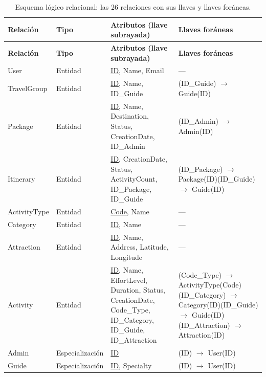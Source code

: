 \documentclass[11pt,a4paper]{article}
\begin{document}
{\footnotesize\setlength{\tabcolsep}{3pt}\renewcommand{\arraystretch}{1.15}
\begin{longtable}{|>{\raggedright\arraybackslash}p{2.88cm}|>{\raggedright\arraybackslash}p{2.35cm}|>{\raggedright\arraybackslash}p{5.00cm}|>{\raggedright\arraybackslash}p{5.07cm}|}
\caption{Esquema lógico relacional: las 26 relaciones con sus llaves y llaves foráneas.}\label{tab:esquema}\\ \hline
\rowcolor{gray!20} \textbf{Relación} & \textbf{Tipo} & \textbf{Atributos (llave subrayada)} & \textbf{Llaves foráneas} \\ \hline
\endfirsthead
\hline \rowcolor{gray!20} \textbf{Relación} & \textbf{Tipo} & \textbf{Atributos (llave subrayada)} & \textbf{Llaves foráneas} \\ \hline
\endhead
User & Entidad & \underline{ID}, Name, Email & — \\ \hline
TravelGroup & Entidad & \underline{ID}, Name, ID\_Guide & (ID\_Guide) \ensuremath{\rightarrow} Guide(ID) \\ \hline
Package & Entidad & \underline{ID}, Name, Destination, Status, CreationDate, ID\_Admin & (ID\_Admin) \ensuremath{\rightarrow} Admin(ID) \\ \hline
Itinerary & Entidad & \underline{ID}, CreationDate, Status, ActivityCount, ID\_Package, ID\_Guide & (ID\_Package) \ensuremath{\rightarrow} Package(ID)\newline{}(ID\_Guide) \ensuremath{\rightarrow} Guide(ID) \\ \hline
ActivityType & Entidad & \underline{Code}, Name & — \\ \hline
Category & Entidad & \underline{ID}, Name & — \\ \hline
Attraction & Entidad & \underline{ID}, Name, Address, Latitude, Longitude & — \\ \hline
Activity & Entidad & \underline{ID}, Name, EffortLevel, Duration, Status, CreationDate, Code\_Type, ID\_Category, ID\_Guide, ID\_Attraction & (Code\_Type) \ensuremath{\rightarrow} ActivityType(Code)\newline{}(ID\_Category) \ensuremath{\rightarrow} Category(ID)\newline{}(ID\_Guide) \ensuremath{\rightarrow} Guide(ID)\newline{}(ID\_Attraction) \ensuremath{\rightarrow} Attraction(ID) \\ \hline
Admin & Especialización & \underline{ID} & (ID) \ensuremath{\rightarrow} User(ID) \\ \hline
Guide & Especialización & \underline{ID}, Specialty & (ID) \ensuremath{\rightarrow} User(ID) \\ \hline

\end{longtable}}
\end{document}
